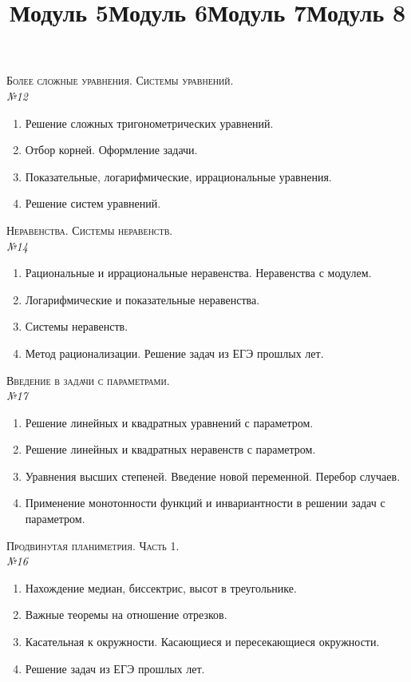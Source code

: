 \documentclass[12pt, a4paper]{article}
\begin{document}
\newpage
\title{Модуль 5}
\textsc{Более сложные уравнения. Системы уравнений.}\\[0.5em]
\textit{№12}
\begin{enumerate}[label=\textbf{\arabic*})]
	\item Решение сложных тригонометрических уравнений.
	\item Отбор корней. Оформление задачи.
	\item Показательные, логарифмические, иррациональные уравнения.
	\item Решение систем уравнений.
\end{enumerate}
\title{Модуль 6}
\textsc{Неравенства. Системы неравенств.}\\[0.5em]
\textit{№14}
\begin{enumerate}[label=\textbf{\arabic*})]
	\item Рациональные и иррациональные неравенства. Неравенства с модулем.
	\item Логарифмические и показательные неравенства.
	\item Системы неравенств.
	\item Метод рационализации. Решение задач из ЕГЭ прошлых лет.
\end{enumerate}
\title{Модуль 7}
\textsc{Введение в задачи с параметрами.}\\[0.5em]
\textit{№17}
\begin{enumerate}[label=\textbf{\arabic*})]
	\item Решение линейных и квадратных уравнений с параметром.
	\item Решение линейных и квадратных неравенств с параметром.
	\item Уравнения высших степеней. Введение новой переменной. Перебор случаев.
	\item Применение монотонности функций и инвариантности в решении задач с параметром.
\end{enumerate}
\title{Модуль 8}
\textsc{Продвинутая планиметрия. Часть 1.}\\[0.5em]
\textit{№16}
\begin{enumerate}[label=\textbf{\arabic*})]
	\item Нахождение медиан, биссектрис, высот в треугольнике.
	\item Важные теоремы на отношение отрезков.
	\item Касательная к окружности. Касающиеся и пересекающиеся окружности.
	\item Решение задач из ЕГЭ прошлых лет.
\end{enumerate}
\end{document}
